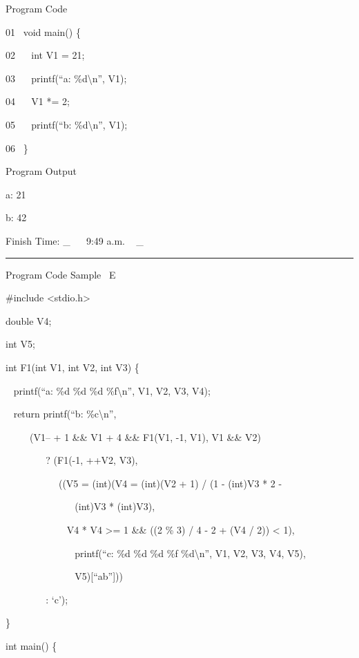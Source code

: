 \documentclass[]{article}
\begin{document}
{}

{Program Code}

{}

{01 ~void main() \{}

{02 ~ ~int V1 = 21;}

{03 ~ ~printf(``a: \%d\textbackslash{}n'', V1);}

{04 ~ ~V1 *= 2;}

{05 ~ ~printf(``b: \%d\textbackslash{}n'', V1);}

{06 ~\}}

{}

{Program Output}

{}

{a: 21}

{b: 42}

{}

{Finish Time}{: }{\_ ~ ~9:49 a.m. ~ \_}

\begin{center}\rule{0.5\linewidth}{\linethickness}\end{center}

{Program Code Sample ~E}

{}

{\#include \textless{}stdio.h\textgreater{}}

{double V4;}

{int V5;}

{}

{int F1(int V1, int V2, int V3) \{}

{~ printf(``a: \%d \%d \%d \%f\textbackslash{}n'', V1, V2, V3, V4);}

{~ return printf(``b: \%c\textbackslash{}n'',}

{~ ~ ~ (V1-- + 1 \&\& V1 + 4 \&\& F1(V1, -1, V1), V1 \&\& V2)}

{~ ~ ~ ~ ~ ? (F1(-1, ++V2, V3),}

{~ ~ ~ ~ ~ ~ ~((V5 = (int)(V4 = (int)(V2 + 1) / (1 - (int)V3 * 2 -}

{~ ~ ~ ~ ~ ~ ~ ~ ~(int)V3 * (int)V3),}

{~ ~ ~ ~ ~ ~ ~ ~V4 * V4 \textgreater{}= 1 \&\& ((2 \% 3) / 4 - 2 + (V4 /
2)) \textless{} 1),}

{~ ~ ~ ~ ~ ~ ~ ~ ~printf(``c: \%d \%d \%d \%f \%d\textbackslash{}n'',
V1, V2, V3, V4, V5),}

{~ ~ ~ ~ ~ ~ ~ ~ ~V5){[}``ab''{]}))}

{~ ~ ~ ~ ~ : `c');}

{\}}

{}

{int main() \{}
\end{document}
